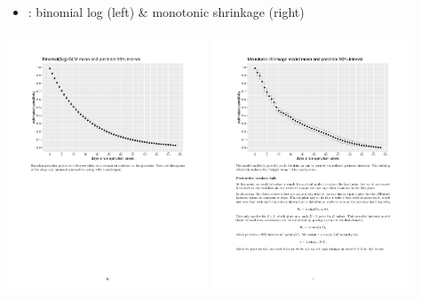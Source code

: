 \documentclass[9pt]{report}
\begin{document}
\begin{itemize}
\item {}: binomial log (left) \& monotonic shrinkage (right)
\end{itemize}
\begin{center}
\includegraphics[width=0.45\textwidth]{img/bayes-binomial-log.pdf}
\quad
\includegraphics[width=0.45\textwidth]{img/monotonicity-bayes.pdf}
\end{center}
\end{document}
